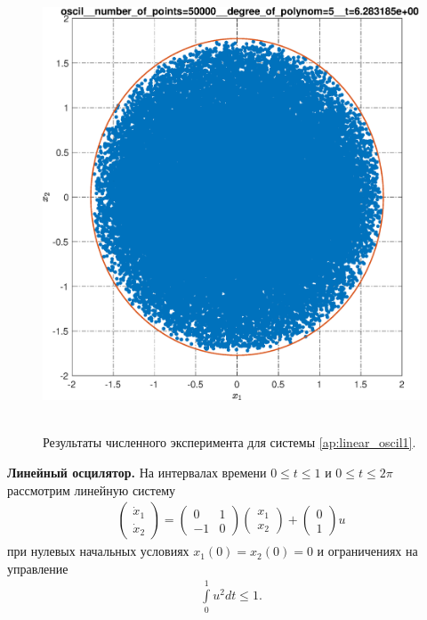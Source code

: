 \documentclass[../main.tex]{subfiles}
\begin{document}
\begin{figure}[ht!]
\begin{minipage}[b]{.3\linewidth}
  	\end{minipage}
  	\hfill
  	\begin{minipage}[b]{.3\linewidth} 
  		\small
  		\centering
  		\includegraphics[width=\linewidth]{images/oscil__number_of_points=50000__degree_of_polynom=5__t=2pi.eps}
  	\end{minipage} 
  	\caption{Результаты численного эксперимента для системы \eqref{ap:linear_oscil1}.}\label{fig:ap:rs_linear_oscil}
  \end{figure}
  \textbf{Линейный осцилятор.} На интервалах времени $ 0 \leqslant t \leqslant 1$  и $ 0 \leqslant t \leqslant 2\pi$ рассмотрим линейную систему 
  \begin{gather}\label{ap:linear_oscil1}
  	\begin{pmatrix} 
  		\dot{x}_1 \\
  		\dot{x}_2  
  	\end{pmatrix} = 
  	\begin{pmatrix}
  		0 & 1 \\
  		-1 & 0
  	\end{pmatrix}
  	\begin{pmatrix} 
  		x_1 \\
  		x_2  
  	\end{pmatrix} +
  	\begin{pmatrix} 0 \\ 1
  	\end{pmatrix} u
  \end{gather}
  при нулевых начальных условиях $x_1(0) = x_2(0) = 0 $ и ограничениях на управление 
  \begin{gather*}
  	\int\limits_0^1 u^2dt \leqslant 1.
  \end{gather*}
  
\end{document}

